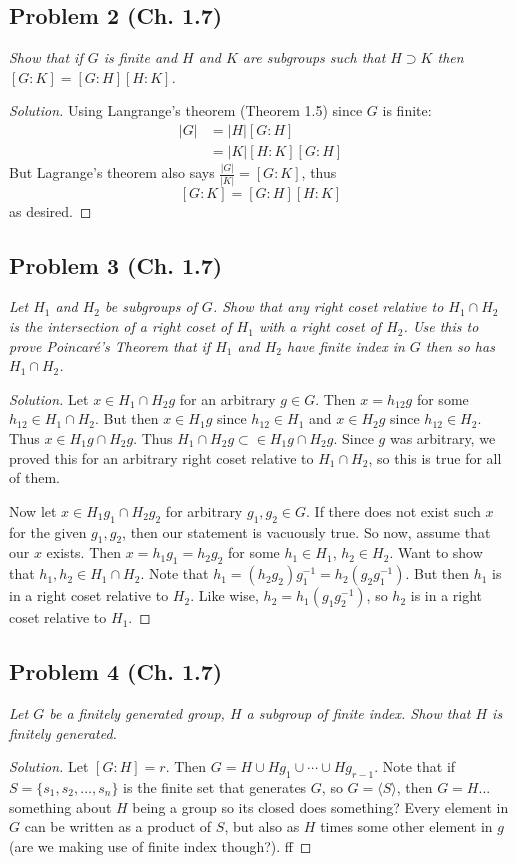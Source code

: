 \documentclass{article}
\begin{document}
\subsection*{Problem 2 (Ch. 1.7)}
{\it Show that if $G$ is finite and $H$ and $K$ are subgroups
such that $H \supset K$
then $[G:K] = [G:H] [H:K]$.}
\begin{proof}[Solution]\let\qed\relax
	Using Langrange's theorem (Theorem 1.5) since $G$ is finite:
	\begin{align*}
		|G|
		&= |H|[G:H]\\
		&= |K|[H:K][G:H]
	\end{align*}
	But Lagrange's theorem also says $\frac{|G|}{|K|} = [G:K]$,
	thus
	\[
		[G:K] = [G:H][H:K]
	\]
	as desired.
\end{proof}

\subsection*{Problem 3 (Ch. 1.7)}
{\it Let $H_1$ and $H_2$ be subgroups of $G$.
Show that any right coset relative to $H_1 \cap H_2$
is the intersection of a right coset of $H_1$ with a right coset of $H_2$.
Use this to prove \emph{Poincar\'{e}'s Theorem}
that if $H_1$ and $H_2$ have finite index in $G$ then so has $H_1 \cap H_2$.}
\begin{proof}[Solution]\let\qed\relax
	Let $x \in H_1\cap H_2g$ for an arbitrary $g \in G$.
	Then $x = h_{12}g$ for some $h_{12} \in H_1 \cap H_2$.
	But then $x \in H_1g$ since $h_{12} \in H_1$
	and $x \in H_2g$ since $h_{12} \in H_2$.
	Thus $x \in H_1g \cap H_2g$.
	Thus $H_1\cap H_2g \subset \in H_1g \cap H_2g$.
	Since $g$ was arbitrary, we proved this for an arbitrary right coset
	relative to $H_1 \cap H_2$, so this is true for all of them.

	Now let $x \in H_1g_1 \cap H_2g_2$ for arbitrary $g_1,g_2\in G$.
	If there does not exist such $x$ for the given $g_1,g_2$,
	then our statement is vacuously true.
	So now, assume that our $x$ exists.
	Then $x = h_1g_1 = h_2g_2$ for some $h_1 \in H_1$, $h_2 \in H_2$.
	Want to show that $h_1,h_2 \in H_1 \cap H_2$.
	Note that $h_1 = (h_2g_2)g_1^{-1} = h_2(g_2g_1^{-1})$.
	But then $h_1$ is in a right coset relative to $H_2$.
	Like wise, $h_2 = h_1(g_1g_2^{-1})$, so $h_2$ is in a right coset relative to $H_1$.
\end{proof}

\subsection*{Problem 4 (Ch. 1.7)}
{\it Let $G$ be a finitely generated group,
$H$ a subgroup of finite index.
Show that $H$ is finitely generated.}
\begin{proof}[Solution]\let\qed\relax
	Let $[G : H] = r$.
	Then $G = H \cup Hg_1 \cup \cdots \cup Hg_{r-1}$.
	Note that if $S = \{s_1,s_2,\dots,s_n\}$ is the finite set that generates $G$,
	so $G = \langle S \rangle$,
	then $G = H $...
	something about $H$ being a group so its closed does something?
	Every element in $G$ can be written as a product of $S$,
	but also as $H$ times some other element in $g$ (are we making use of finite index though?).
	ff
\end{proof}
\end{document}
